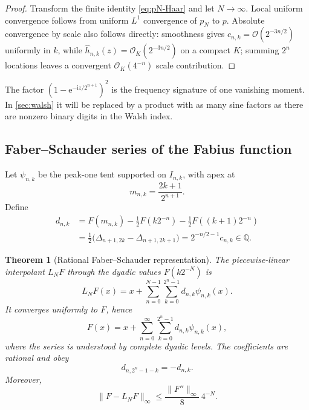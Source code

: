 \documentclass[11pt,oneside]{article}
\newtheorem{theorem}{Theorem}[section]
\theoremstyle{definition}
\theoremstyle{remark}
\newcommand{\Q}{\mathbb Q}
\newcommand{\e}{\mathrm e}
\newcommand{\ii}{\mathrm i}
\newcommand{\bigO}{\mathcal O}
\begin{document}
\begin{proof}
Transform the finite identity \eqref{eq:pN-Haar} and let $N\to\infty$.
Local uniform convergence follows from uniform $L^1$ convergence of $p_N$ to
$p$.  Absolute convergence by scale also follows directly: smoothness gives
$c_{n,k}=\bigO(2^{-3n/2})$ uniformly in $k$, while
$\widehat h_{n,k}(z)=\bigO_K(2^{-3n/2})$ on a compact $K$; summing $2^n$
locations leaves a convergent $\bigO_K(4^{-n})$ scale contribution.
\end{proof}

The factor $(1-\e^{-\ii z/2^{n+1}})^2$ is the frequency signature of one
vanishing moment.  In \cref{sec:walsh} it will be replaced by a product with as
many sine factors as there are nonzero binary digits in the Walsh index.

\subsection{Faber--Schauder series of the Fabius function}

Let $\psi_{n,k}$ be the peak-one tent supported on $I_{n,k}$, with apex at
\begin{equation}\label{eq:Schauder-midpoint}
 m_{n,k}=\frac{2k+1}{2^{n+1}}.
\end{equation}
Define
\begin{align}
 d_{n,k}
 &=F(m_{n,k})-\frac12F(k2^{-n})-\frac12F((k+1)2^{-n})
 \label{eq:d-Schauder-def}\\
 &=\frac12\bigl(\Delta_{n+1,2k}-\Delta_{n+1,2k+1}\bigr)
 =2^{-n/2-1}c_{n,k}\in\Q.
 \label{eq:d-mass}
\end{align}

\begin{theorem}[Rational Faber--Schauder representation]
\label{thm:Faber-Schauder-F}
The piecewise-linear interpolant $L_NF$ through the dyadic values
$F(k2^{-N})$ is
\begin{equation}\label{eq:LN-F-Schauder}
 L_NF(x)=x+\sum_{n=0}^{N-1}\sum_{k=0}^{2^n-1}
 d_{n,k}\psi_{n,k}(x).
\end{equation}
It converges uniformly to $F$, hence
\begin{equation}\label{eq:F-Schauder-series}
 F(x)=x+\sum_{n=0}^\infty\sum_{k=0}^{2^n-1}
 d_{n,k}\psi_{n,k}(x),
\end{equation}
where the series is understood by complete dyadic levels.  The coefficients are
rational and obey
\begin{equation}\label{eq:d-antisymmetry}
 d_{n,2^n-1-k}=-d_{n,k}.
\end{equation}
Moreover,
\begin{equation}\label{eq:F-interpolation-error}
 \|F-L_NF\|_\infty
 \le\frac{\|F''\|_\infty}{8}\,4^{-N}.
\end{equation}
\end{theorem}
\end{document}
